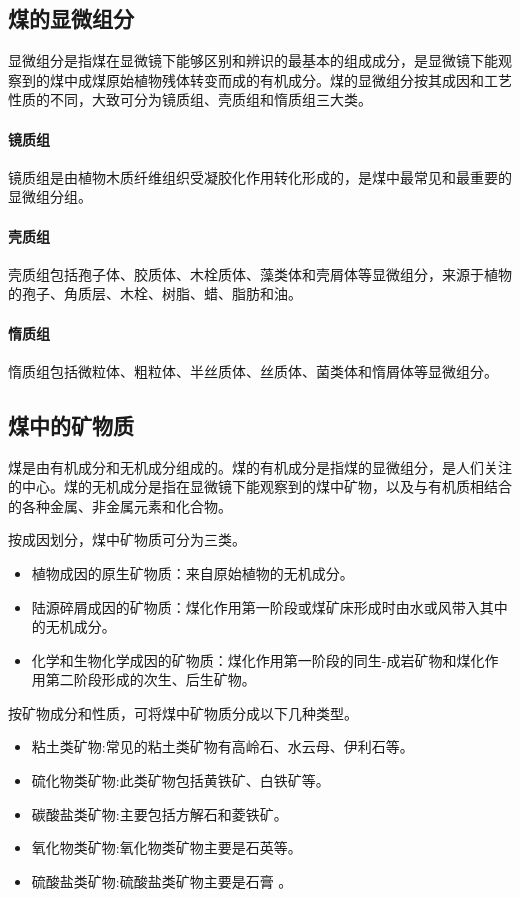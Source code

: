 \documentclass[10pt,openany]{ctexbook}
\begin{document}
\subsection{煤的显微组分}
显微组分是指煤在显微镜下能够区别和辨识的最基本的组成成分，是显微镜下能观察到的煤中成煤原始植物残体转变而成的有机成分。煤的显微组分按其成因和工艺性质的不同，大致可分为镜质组、壳质组和惰质组三大类。    \par
\paragraph{镜质组}
   镜质组是由植物木质纤维组织受凝胶化作用转化形成的，是煤中最常见和最重要的显微组分组。
\paragraph{壳质组}
   壳质组包括孢子体、胶质体、木栓质体、藻类体和壳屑体等显微组分，来源于植物的孢子、角质层、木栓、树脂、蜡、脂肪和油。
\paragraph{惰质组}
   惰质组包括微粒体、粗粒体、半丝质体、丝质体、菌类体和惰屑体等显微组分。

\subsection{煤中的矿物质}

   煤是由有机成分和无机成分组成的。煤的有机成分是指煤的显微组分，是人们关注的中心。煤的无机成分是指在显微镜下能观察到的煤中矿物，以及与有机质相结合的各种金属、非金属元素和化合物。\par
按成因划分，煤中矿物质可分为三类。
\begin{itemize}
\item 植物成因的原生矿物质：来自原始植物的无机成分。
\item 陆源碎屑成因的矿物质：煤化作用第一阶段或煤矿床形成时由水或风带入其中的无机成分。
\item 化学和生物化学成因的矿物质：煤化作用第一阶段的同生-成岩矿物和煤化作用第二阶段形成的次生、后生矿物。
\end{itemize}
按矿物成分和性质，可将煤中矿物质分成以下几种类型。
\begin{itemize}

\item 粘土类矿物:常见的粘土类矿物有高岭石、水云母、伊利石等。
\item 硫化物类矿物:此类矿物包括黄铁矿、白铁矿等。
\item 碳酸盐类矿物:主要包括方解石和菱铁矿。
\item 氧化物类矿物:氧化物类矿物主要是石英等。
\item 硫酸盐类矿物:硫酸盐类矿物主要是石膏 。
\end{itemize}
\end{document}
